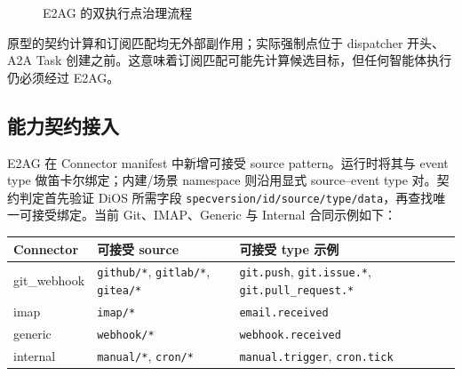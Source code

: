 \begin{figure}[htbp]
{
}
\caption{E2AG 的双执行点治理流程}
\label{fig:e2ag-flow}
\end{figure}

原型的契约计算和订阅匹配均无外部副作用；实际强制点位于 dispatcher 开头、A2A Task 创建之前。这意味着订阅匹配可能先计算候选目标，但任何智能体执行仍必须经过 E2AG。

\subsection{能力契约接入}\label{42-ux80fdux529bux5951ux7ea6ux63a5ux5165}

E2AG 在 Connector manifest 中新增可接受 source pattern。运行时将其与 event type 做笛卡尔绑定；内建/场景 namespace 则沿用显式 source--event type 对。契约判定首先验证 DiOS 所需字段 \texttt{specversion/id/source/type/data}，再查找唯一可接受绑定。当前 Git、IMAP、Generic 与 Internal 合同示例如下：

{
\begin{longtable}[]{@{}lll@{}}
\toprule\noalign{}
Connector & 可接受 source & 可接受 type 示例 \\
\midrule\noalign{}
\endhead
\bottomrule\noalign{}
\endlastfoot
git\_webhook & \texttt{github/*}, \texttt{gitlab/*}, \texttt{gitea/*} & \texttt{git.push}, \texttt{git.issue.*}, \texttt{git.pull\_request.*} \\
imap & \texttt{imap/*} & \texttt{email.received} \\
generic & \texttt{webhook/*} & \texttt{webhook.received} \\
internal & \texttt{manual/*}, \texttt{cron/*} & \texttt{manual.trigger}, \texttt{cron.tick} \\
\end{longtable}
}

